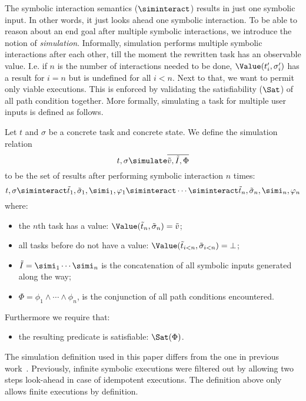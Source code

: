The symbolic interaction semantics ($\siminteract$) results in just one symbolic input.
In other words, it just looks ahead one symbolic interaction.
To be able to reason about an end goal after multiple symbolic interactions,
we introduce the notion of \emph{simulation}.
Informally, simulation performs multiple symbolic interactions after each other,
till the moment the rewritten task has an observable value.
I.e. if $n$ is the number of interactions needed to be done,
$\Value(t_i', \sigma_i')$ has a result for $i = n$ but is undefined for all $i < n$.
Next to that, we want to permit only viable executions.
This is enforced by validating the satisfiability ($\Sat$) of all path condition together.
More formally, simulating a task for multiple user inputs is defined as follows.

\begin{definition}[Simulation]
  Let $t$ and $\sigma$ be a concrete task and concrete state.
  We define the simulation relation
  \begin{equation*}
    t,\sigma \simulate \overline{\tilde{v},\tilde{I},\Phi}
  \end{equation*}
  to be the set of results after performing symbolic interaction $n$ times:
  \begin{equation*}
      t,\sigma
        \siminteract \tilde{t}_1,\tilde{\sigma}_1,\simi_1,\phi_1
        \siminteract \cdots
        \siminteract \tilde{t}_n,\tilde{\sigma}_n,\simi_n,\phi_n
  \end{equation*}
  where:
  \begin{itemize}
    \item the $n$th task has a value: $\Value(\tilde{t}_n,\tilde{\sigma}_n) = \tilde{v}$;
    \item all tasks before do not have a value: $\Value(\tilde{t}_{i<n},\tilde{\sigma}_{i<n}) = \bot$;
    \item $\tilde{I} = \simi_1 \cdots \simi_n$ is the concatenation of all symbolic inputs generated along the way;
    \item $\Phi = \phi_1 \land \cdots \land \phi_n$, is the conjunction of all path conditions encountered.
  \end{itemize}
  Furthermore we require that:
  \begin{itemize}
    \item the resulting predicate is satisfiable: $\Sat(\Phi)$.
  \end{itemize}
\end{definition}

The simulation definition used in this paper differs from the one in previous work~\cite{Naus2019}.
Previously, infinite symbolic executions were filtered out by allowing two steps look-ahead in case of idempotent executions.
The definition above only allows finite executions by definition.

